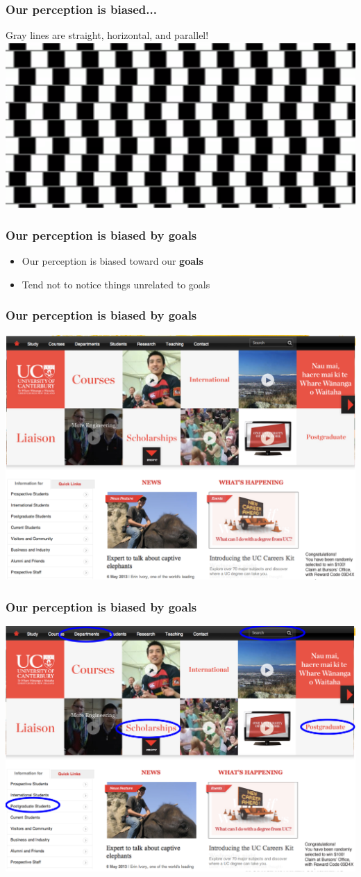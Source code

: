 \documentclass{beamer}
\begin{document}
\begin{frame}
\frametitle{Our perception is biased...}
Gray lines are straight, horizontal, and parallel!
\centering
\includegraphics[width=1\linewidth]{image/perception10}
\end{frame}

\begin{frame}
\frametitle{Our perception is biased by goals}
\begin{itemize}
\item Our perception is biased toward our \textbf{goals}
\item Tend not to notice things unrelated to goals
\end{itemize}
\end{frame}

\begin{frame}
\frametitle{Our perception is biased by goals}
\centering
\includegraphics[width=0.8\linewidth]{image/perception11}
\end{frame}

\begin{frame}
\frametitle{Our perception is biased by goals}
\centering
\includegraphics[width=0.8\linewidth]{image/perception12}
\end{frame}
\end{document}
